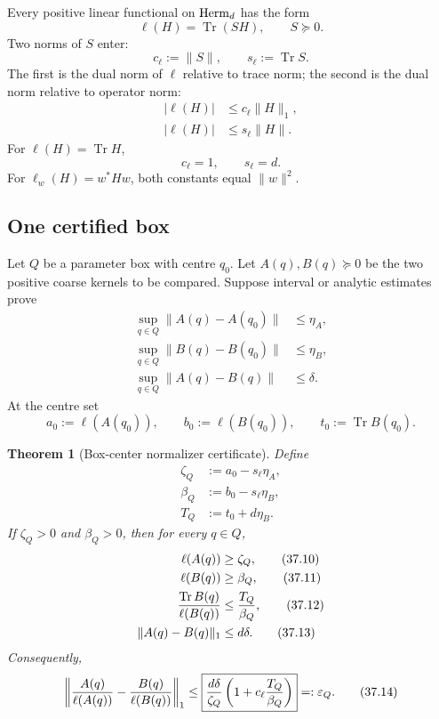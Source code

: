 \documentclass[11pt]{article}
\newtheorem{theorem}{Theorem}[section]
\theoremstyle{remark}
\begin{document}
Every positive linear functional on \({\rm Herm}_d\) has the form
\begin{equation}
 \ell(H)=\operatorname{Tr}(SH),\qquad S\succeq0.             \tag{37.1}
\end{equation}
Two norms of \(S\) enter:
\[
 c_\ell:=\|S\|,
 \qquad
 s_\ell:=\operatorname{Tr}S.
\]
The first is the dual norm of \(\ell\) relative to trace norm; the
second is the dual norm relative to operator norm:
\begin{align}
 |\ell(H)|&\leq c_\ell\|H\|_1,                              \tag{37.2}\\
 |\ell(H)|&\leq s_\ell\|H\|.                                \tag{37.3}
\end{align}
For \(\ell(H)=\operatorname{Tr}H\),
\[
 c_\ell=1,\qquad s_\ell=d.
\]
For \(\ell_w(H)=w^*Hw\), both constants equal \(\|w\|^2\).

\subsection{One certified box}

Let \(Q\) be a parameter box with centre \(q_0\).  Let
\(A(q),B(q)\succeq0\) be the two positive coarse kernels to be
compared.  Suppose interval or analytic estimates prove
\begin{align}
 \sup_{q\in Q}\|A(q)-A(q_0)\|&\leq\eta_A,          \tag{37.4}\\
 \sup_{q\in Q}\|B(q)-B(q_0)\|&\leq\eta_B,          \tag{37.5}\\
 \sup_{q\in Q}\|A(q)-B(q)\|&\leq\delta.            \tag{37.6}
\end{align}
At the centre set
\[
 a_0:=\ell(A(q_0)),\qquad
 b_0:=\ell(B(q_0)),\qquad
 t_0:=\operatorname{Tr}B(q_0).
\]

\begin{theorem}[Box-center normalizer certificate]
\label{thm:v12v37-box}
Define
\begin{align}
 \zeta_Q&:=a_0-s_\ell\eta_A,                     \tag{37.7}\\
 \beta_Q&:=b_0-s_\ell\eta_B,                     \tag{37.8}\\
 T_Q&:=t_0+d\eta_B.                              \tag{37.9}
\end{align}
If \(\zeta_Q>0\) and \(\beta_Q>0\), then for every \(q\in Q\),
\begin{align}
 \ell(A(q))&\geq\zeta_Q,                         \tag{37.10}\\
 \ell(B(q))&\geq\beta_Q,                         \tag{37.11}\\
 {\operatorname{Tr}B(q)\over\ell(B(q))}
 &\leq {T_Q\over\beta_Q},                        \tag{37.12}\\
 \|A(q)-B(q)\|_1&\leq d\delta.                   \tag{37.13}
\end{align}
Consequently,
\begin{equation}
 \left\|
 {A(q)\over\ell(A(q))}
 -
 {B(q)\over\ell(B(q))}
 \right\|_1
 \leq
 \boxed{
 {d\delta\over\zeta_Q}
 \left(1+c_\ell{T_Q\over\beta_Q}\right)}
 =:\varepsilon_Q.                                \tag{37.14}
\end{equation}
\end{theorem}
\end{document}
